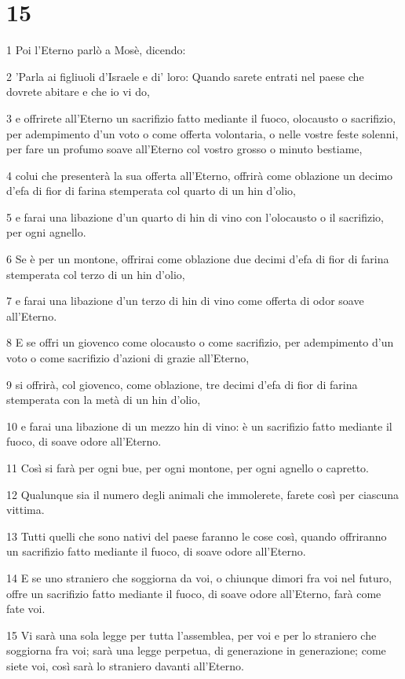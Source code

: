 \chapter{15}

\par 1 Poi l'Eterno parlò a Mosè, dicendo:
\par 2 'Parla ai figliuoli d'Israele e di' loro: Quando sarete entrati nel paese che dovrete abitare e che io vi do,
\par 3 e offrirete all'Eterno un sacrifizio fatto mediante il fuoco, olocausto o sacrifizio, per adempimento d'un voto o come offerta volontaria, o nelle vostre feste solenni, per fare un profumo soave all'Eterno col vostro grosso o minuto bestiame,
\par 4 colui che presenterà la sua offerta all'Eterno, offrirà come oblazione un decimo d'efa di fior di farina stemperata col quarto di un hin d'olio,
\par 5 e farai una libazione d'un quarto di hin di vino con l'olocausto o il sacrifizio, per ogni agnello.
\par 6 Se è per un montone, offrirai come oblazione due decimi d'efa di fior di farina stemperata col terzo di un hin d'olio,
\par 7 e farai una libazione d'un terzo di hin di vino come offerta di odor soave all'Eterno.
\par 8 E se offri un giovenco come olocausto o come sacrifizio, per adempimento d'un voto o come sacrifizio d'azioni di grazie all'Eterno,
\par 9 si offrirà, col giovenco, come oblazione, tre decimi d'efa di fior di farina stemperata con la metà di un hin d'olio,
\par 10 e farai una libazione di un mezzo hin di vino: è un sacrifizio fatto mediante il fuoco, di soave odore all'Eterno.
\par 11 Così si farà per ogni bue, per ogni montone, per ogni agnello o capretto.
\par 12 Qualunque sia il numero degli animali che immolerete, farete così per ciascuna vittima.
\par 13 Tutti quelli che sono nativi del paese faranno le cose così, quando offriranno un sacrifizio fatto mediante il fuoco, di soave odore all'Eterno.
\par 14 E se uno straniero che soggiorna da voi, o chiunque dimori fra voi nel futuro, offre un sacrifizio fatto mediante il fuoco, di soave odore all'Eterno, farà come fate voi.
\par 15 Vi sarà una sola legge per tutta l'assemblea, per voi e per lo straniero che soggiorna fra voi; sarà una legge perpetua, di generazione in generazione; come siete voi, così sarà lo straniero davanti all'Eterno.
